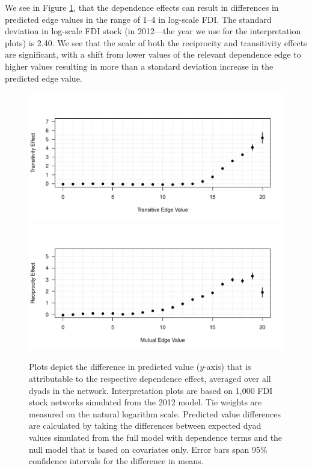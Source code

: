 \documentclass[reqno,onecolumn,letterpaper,12pt]{article}
\begin{document}
We see in Figure \ref{fig:interpret}, that the dependence effects can result in differences in predicted edge values in the range of 1--4 in log-scale FDI.  The standard deviation in log-scale FDI stock (in 2012---the year we use for the interpretation plots) is 2.40.  We see that the scale of both the reciprocity and transitivity effects are significant, with a shift from lower values of the relevant dependence edge to higher values resulting in more than a standard deviation increase in the predicted edge value.
\begin{figure}[!h]
\centering
\includegraphics[scale=.75]{draft_figures/transitiveInterpretation.pdf} \vspace{-.5cm}\\
\includegraphics[scale=.75]{draft_figures/mutualInterpretation.pdf} \vspace{-.5cm}
\caption{\label{fig:interpret} Plots depict the difference in predicted value ($y$-axis) that is attributable to the respective dependence effect, averaged over all dyads in the network. Interpretation plots are based on 1,000 FDI stock networks simulated from the 2012 model. Tie weights are measured on the natural logarithm scale. Predicted value differences are calculated by taking the differences between expected dyad values simulated from the full model with dependence terms and the null model that is based on covariates only. Error bars span 95\% confidence intervals for the difference in means. }
\end{figure}
\end{document}

